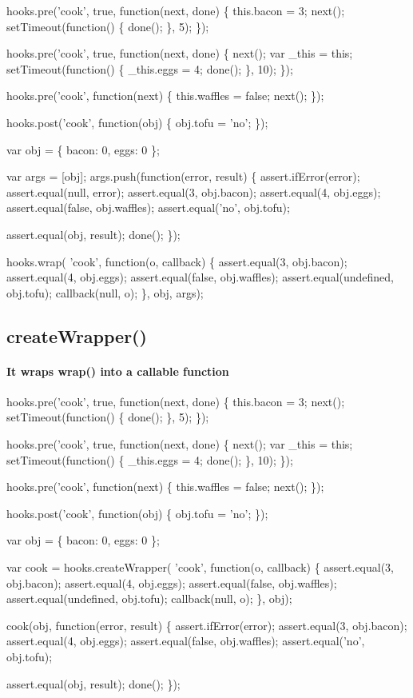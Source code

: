 \begin{DoxyCode}
hooks.pre('cook', true, function(next, done) \{
  this.bacon = 3;
  next();
  setTimeout(function() \{
    done();
  \}, 5);
\});

hooks.pre('cook', true, function(next, done) \{
  next();
  var \_this = this;
  setTimeout(function() \{
    \_this.eggs = 4;
    done();
  \}, 10);
\});

hooks.pre('cook', function(next) \{
  this.waffles = false;
  next();
\});

hooks.post('cook', function(obj) \{
  obj.tofu = 'no';
\});

var obj = \{ bacon: 0, eggs: 0 \};

var args = [obj];
args.push(function(error, result) \{
  assert.ifError(error);
  assert.equal(null, error);
  assert.equal(3, obj.bacon);
  assert.equal(4, obj.eggs);
  assert.equal(false, obj.waffles);
  assert.equal('no', obj.tofu);

  assert.equal(obj, result);
  done();
\});

hooks.wrap(
  'cook',
  function(o, callback) \{
    assert.equal(3, obj.bacon);
    assert.equal(4, obj.eggs);
    assert.equal(false, obj.waffles);
    assert.equal(undefined, obj.tofu);
    callback(null, o);
  \},
  obj,
  args);
\end{DoxyCode}


\subsection*{create\+Wrapper()}

\paragraph*{It wraps wrap() into a callable function}


\begin{DoxyCode}
hooks.pre('cook', true, function(next, done) \{
  this.bacon = 3;
  next();
  setTimeout(function() \{
    done();
  \}, 5);
\});

hooks.pre('cook', true, function(next, done) \{
  next();
  var \_this = this;
  setTimeout(function() \{
    \_this.eggs = 4;
    done();
  \}, 10);
\});

hooks.pre('cook', function(next) \{
  this.waffles = false;
  next();
\});

hooks.post('cook', function(obj) \{
  obj.tofu = 'no';
\});

var obj = \{ bacon: 0, eggs: 0 \};

var cook = hooks.createWrapper(
  'cook',
  function(o, callback) \{
    assert.equal(3, obj.bacon);
    assert.equal(4, obj.eggs);
    assert.equal(false, obj.waffles);
    assert.equal(undefined, obj.tofu);
    callback(null, o);
  \},
  obj);

cook(obj, function(error, result) \{
  assert.ifError(error);
  assert.equal(3, obj.bacon);
  assert.equal(4, obj.eggs);
  assert.equal(false, obj.waffles);
  assert.equal('no', obj.tofu);

  assert.equal(obj, result);
  done();
\});
\end{DoxyCode}


